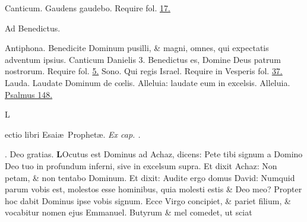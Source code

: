 \documentclass[letter,11pt]{book}
\makeatletter
\DeclareRobustCommand{\Rbar}{\vers@resp{0pt}{R}}
\newcommand{\vers@resp@sym}{\raisebox{0.2ex}{\rotatebox[origin=c]{-20}{$\m@th\rceil$}}}
\newcommand{\vers@resp}[2]{%
  {\ooalign{\hidewidth\kern#1\vers@resp@sym\hidewidth\cr#2\cr}}%
}%
\def\R{\color{Red} \Rbar . \color{black}}
\makeatother
\begin{document}
\begin{multicols}{2}
\newline \color{Red} Canticum. \color{black} Gaudens gaudebo. \color{Red} Require fol. \color{black} \hyperlink{WED-SECUNDA-ADV-LAU}{17.}
\vspace{-.5em} \begin{center} \color{Red} Ad Benedictus. \color{black} \end{center} \vspace{-.5em}
\par \noindent \color{Red} Antiphona. \color{black} Benedicite Dominum pusilli, \& magni, omnes, qui expectatis adventum ipsius.
\newline \color{Red} Canticum Danielis 3. \color{black} Benedictus es, Domine Deus patrum nostrorum. \color{Red} Require fol. \color{black} \hyperlink{benedictus}{5.}
\newline \color{Red} Sono. \color{black} Qui regis Israel. \color{Red} Require in Vesperis fol. \color{black} \hyperlink{DOM-SEXTO-ADV-VES}{37.}
\newline \color{Red} Lauda. \color{black} Laudate Dominum de c\oe lis. Alleluia: laudate eum in excelsis. Alleluia. \color{Red} \hyperlink{ps148}{Psalmus 148.} \color{black}
\vspace{-.5em} \begin{center} \hypertarget{isaias.7} {\color{Red} L}ectio libri Esai\ae \ Prophet\ae . \itshape Ex cap. . \color{black} \end{center} \vspace{-.5em}
\par \noindent \R Deo gratias.
\lettrine[lines=2]{\bfseries \color{Red} L}{}Ocutus est Dominus ad Achaz, dicens: Pete tibi signum a Domino Deo tuo in profundum inferni, sive in excelsum supra. Et dixit Achaz: Non petam, \& non tentabo Dominum. Et dixit: Audite ergo domus David: Numquid parum vobis est, molestos esse hominibus, quia molesti estis \& Deo meo? Propter hoc dabit Dominus ipse vobis signum. Ecce Virgo concipiet, \& pariet filium, \& vocabitur nomen ejus Emmanuel. Butyrum \& mel comedet, ut sciat

\end{multicols}
\end{document}
